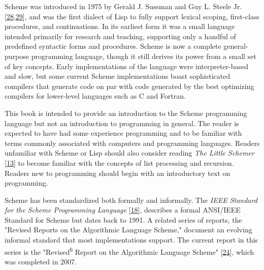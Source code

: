 
\label{preface_h0}




Scheme was introduced in 1975 by Gerald J. Sussman
and
Guy L. Steele Jr. [\hyperref[bibliography_g246]{28},\hyperref[bibliography_g247]{29}],
and was the
first dialect of \label{preface_s0}Lisp to fully support lexical scoping, first-class
procedures, and continuations.
In its earliest form it was a small language intended primarily
for research and teaching, supporting only a handful of predefined
syntactic forms and procedures.
Scheme is now a complete general-purpose programming language,
though it still derives its power from a small set of key concepts.
Early implementations of the language were interpreter-based
and slow, but some current Scheme implementations boast sophisticated
compilers that generate code on par with code generated by the best
optimizing compilers for lower-level languages such as C and Fortran.


This book is intended to provide an introduction to the Scheme programming language
but not an introduction to programming in general.
The reader is expected to have had some experience programming and
to be familiar with terms commonly associated with computers and
programming languages.
Readers unfamiliar with Scheme or Lisp should
also consider reading \textit{The Little Schemer} [\hyperref[bibliography_g231]{13}] to become familiar with
the concepts of list processing and recursion.
Readers new to programming should begin with an introductory text on
programming.


Scheme has been standardized both formally and informally.
The \label{preface_s1}\textit{IEEE Standard for the Scheme Programming
Language} [\hyperref[bibliography_g236]{18}], describes a formal
ANSI/IEEE Standard for Scheme but dates back to 1991.
A related series of reports, the "\label{preface_s2}Revised Reports on the
Algorithmic Language Scheme," document an evolving informal standard that
most implementations support.
The current report in this series is the "Revised\textsuperscript{6} Report on the
Algorithmic Language Scheme" [\hyperref[bibliography_g242]{24}], which was completed in 2007.


